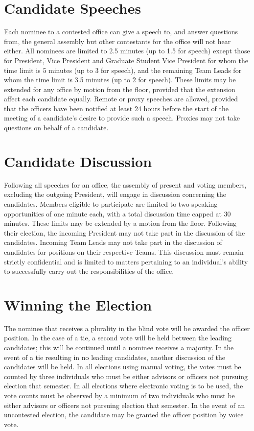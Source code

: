 \section{Candidate Speeches}
Each nominee to a contested office can give a speech to, and answer questions from, the general assembly but other contestants for the office will not hear either.
All nominees are limited to 2.5 minutes (up to 1.5 for speech) except those for President, Vice President and Graduate Student Vice President for whom the time limit is 5 minutes (up to 3 for speech), and the remaining Team Leads for whom the time limit is 3.5 minutes (up to 2 for speech).
These limits may be extended for any office by motion from the floor, provided that the extension affect each candidate equally.
Remote or proxy speeches are allowed, provided that the officers have been notified at least 24 hours before the start of the meeting of a candidate's desire to provide such a speech.
Proxies may not take questions on behalf of a candidate.
\section{Candidate Discussion}
Following all speeches for an office, the assembly of present and voting members, excluding the outgoing President, will engage in discussion concerning the candidates.
Members eligible to participate are limited to two speaking opportunities of one minute each, with a total discussion time capped at 30 minutes. These limits may be extended by a motion from the floor.
Following their election, the incoming President may not take part in the discussion of the candidates.
Incoming Team Leads may not take part in the discussion of candidates for positions on their respective Teams.
This discussion must remain strictly confidential and is limited to matters pertaining to an individual's ability to successfully carry out the responsibilities of the office.
\section{Winning the Election}
The nominee that receives a plurality in the blind vote will be awarded the officer position.
In the case of a tie, a second vote will be held between the leading candidates; this will be continued until a nominee receives a majority.
In the event of a tie resulting in no leading candidates, another discussion of the candidates will be held.
In all elections using manual voting, the votes must be counted by three individuals who must be either advisors or officers not pursuing election that semester.
In all elections where electronic voting is to be used, the vote counts must be observed by a minimum of two individuals who must be either advisors or officers not pursuing election that semester.
In the event of an uncontested election, the candidate may be granted the officer position by voice vote.

